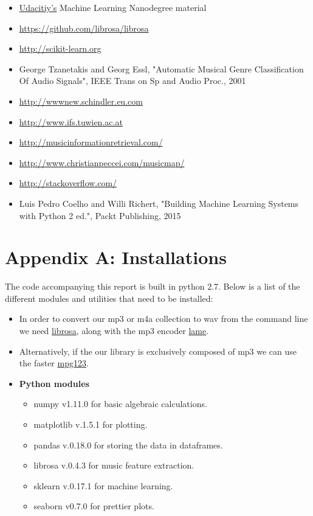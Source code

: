 \documentclass[12pt]{article}
\begin{document}
\begin{itemize}
\item \href{https://www.udacity.com/}{Udacitiy's} Machine Learning Nanodegree material
\item \url{https://github.com/librosa/librosa}
\item \url{http://scikit-learn.org}
\item George Tzanetakis and Georg Essl, "Automatic Musical Genre Classification Of Audio Signals", IEEE Trans on Sp and Audio Proc., 2001
\item \url{http://wwwnew.schindler.eu.com}
\item \url{http://www.ifs.tuwien.ac.at}
\item \url{http://musicinformationretrieval.com/}
\item \url{http://www.christianpeccei.com/musicmap/}
\item \url{http://stackoverflow.com/}
\item Luis Pedro Coelho and Willi Richert, "Building Machine Learning Systems with Python 2 ed.", Packt Publishing, 2015


\end{itemize}








\newpage
\section*{Appendix A: Installations}

The code accompanying this report is built in python 2.7. Below is a list of the different modules and utilities that need to be installed:
\medskip

\begin{itemize}
\item
In order to convert our mp3 or m4a collection to wav from the command line we need \href{https://ffmpeg.org/download.html}{librosa}, along with the mp3 encoder \href{http://lame.sourceforge.net/}{lame}.
\item 
Alternatively, if the our library is exclusively composed of mp3 we can use the faster \href{https://www.mpg123.de/}{mpg123}.

\item
\textbf{Python modules}
\begin{itemize}
\item numpy v1.11.0 for basic algebraic calculations.
\item matplotlib v.1.5.1 for plotting.
\item pandas v.0.18.0 for storing the data in dataframes.
\item librosa v.0.4.3 for music feature extraction.
\item sklearn v.0.17.1 for machine learning.
\item seaborn v0.7.0 for prettier plots.
\end{itemize}
\end{itemize}
\end{document}
